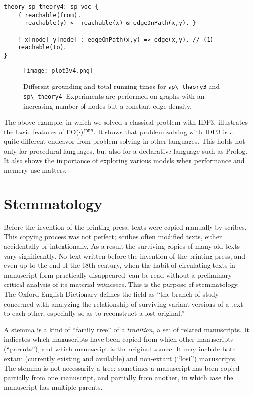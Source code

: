 \documentclass{tlp}
\newcommand{\idpdrie}{{\sc IDP3}\xspace}
\newcommand{\fodotidp}{{\sc FO($\cdot$)$^{\mathtt{IDP3}}$}\xspace}
\renewcommand{\|}{\ensuremath{\,|\,}}
\renewcommand{\|}{\,|\,}
\newcommand{\idpcode}[1]{\lstinline{#1}}
\begin{document}
\begin{lstlisting}[caption={Removing redundant constraints.},label={removeConstraints}]
theory sp_theory4: sp_voc {
    { reachable(from).
      reachable(y) <- reachable(x) & edgeOnPath(x,y). }

    ! x[node] y[node] : edgeOnPath(x,y) => edge(x,y). // (1)
    reachable(to).
}
\end{lstlisting}



\begin{figure}[t]
 \centering
\texttt{[image: plot3v4.png]}

\caption{Different grounding and total running times for \idpcode{sp\_theory3} and \idpcode{sp\_theory4}. Experiments are performed on graphs with an increasing number of nodes but a constant edge density.}
 \label{fig:experiments2}
\end{figure}

The above example, in which we solved a classical problem with
\idpdrie, illustrates the basic features of \fodotidp. It shows that
problem solving with \idpdrie is a quite different endeavor from
problem solving in other languages. This holds not only for procedural
languages, but also for a declarative language such as Prolog. It also
shows the importance of exploring various models when performance and
memory use matters.

\section{Stemmatology}\label{sec:stemma}

Before the invention of the printing press, texts were copied manually
by scribes.  This copying process was not perfect; scribes often
modified texts, either accidentally or intentionally.  As a result the
surviving copies of many old texts vary significantly.  No text
written before the invention of the printing press, and even up to the
end of the 18th century, when the habit of circulating texts in
manuscript form practically disappeared, can be read without a
preliminary critical analysis of its material witnesses.  This is the
purpose of stemmatology.  The Oxford English Dictionary defines the
field as ``the branch of study concerned with analyzing the
relationship of surviving variant versions of a text to each other,
especially so as to reconstruct a lost original.''

A stemma is a kind of ``family tree'' of a {\em tradition}, a set of
related manuscripts.  It indicates which manuscripts have been copied
from which other manuscripts (``parents''), and which manuscript is
the original source.
%
It may include both extant (currently existing and available) and
non-extant (``lost'') manuscripts.  The stemma is not necessarily a
tree: sometimes a manuscript has been copied partially from one
manuscript, and partially from another, in which case the manuscript
has multiple parents.
\end{document}
